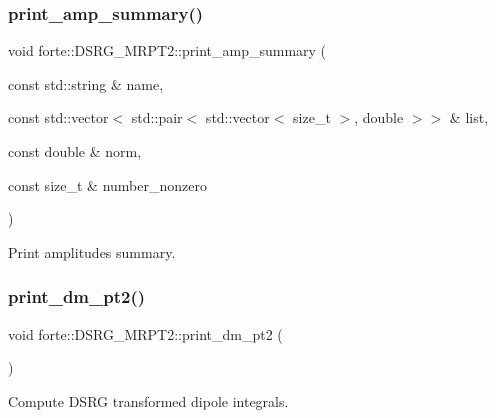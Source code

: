 \subsubsection{\texorpdfstring{print\+\_\+amp\+\_\+summary()}{print\_amp\_summary()}}
{\footnotesize\ttfamily void forte\+::\+D\+S\+R\+G\+\_\+\+M\+R\+P\+T2\+::print\+\_\+amp\+\_\+summary (\begin{DoxyParamCaption}\item[{const std\+::string \&}]{name,  }\item[{const std\+::vector$<$ std\+::pair$<$ std\+::vector$<$ size\+\_\+t $>$, double $>$$>$ \&}]{list,  }\item[{const double \&}]{norm,  }\item[{const size\+\_\+t \&}]{number\+\_\+nonzero }\end{DoxyParamCaption})\hspace{0.3cm}{\ttfamily [protected]}}



Print amplitudes summary. 

\mbox{\label{classforte_1_1_d_s_r_g___m_r_p_t2_a998fe2003292000ad74f8babe57aab12}} 
\subsubsection{\texorpdfstring{print\+\_\+dm\+\_\+pt2()}{print\_dm\_pt2()}}
{\footnotesize\ttfamily void forte\+::\+D\+S\+R\+G\+\_\+\+M\+R\+P\+T2\+::print\+\_\+dm\+\_\+pt2 (\begin{DoxyParamCaption}{ }\end{DoxyParamCaption})\hspace{0.3cm}{\ttfamily [protected]}}



Compute D\+S\+RG transformed dipole integrals. 

\mbox{\label{classforte_1_1_d_s_r_g___m_r_p_t2_a47d0592d168445f748c06a0816d61d9e}} 
